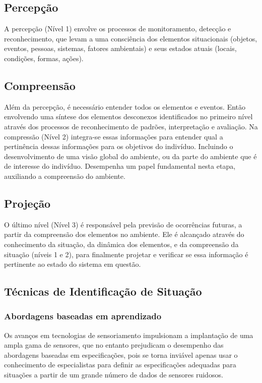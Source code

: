 \documentclass[12pt,a4paper,compsoc]{IEEEtran}
\begin{document}
\subsection{Percepção}

  A percepção (Nível 1)  envolve os processos de monitoramento, detecção e reconhecimento, que
  levam a uma consciência dos elementos situacionais (objetos, eventos, pessoas, sistemas, fatores
  ambientais) e seus estados atuais (locais, condições, formas, ações).


\subsection{Compreensão}

  Além da percepção, é necessário entender todos os elementos e eventos. Então envolvendo uma 
  síntese dos elementos desconexos identificados no primeiro nível através dos processos de 
  reconhecimento de padrões, interpretação e avaliação. Na compressão (Nível 2) integra-se essas
  informações para entender qual a pertinência dessas informações para os objetivos do indivíduo.
  Incluindo o desenvolvimento de uma visão global do ambiente, ou da parte do ambiente que é de 
  interesse do indivíduo. Desempenha um papel fundamental nesta etapa, auxiliando a compreensão do
  ambiente.


\subsection{Projeção}

  O último nível (Nível 3)  é responsável pela previsão de ocorrências futuras, a partir da 
  compreensão dos elementos no ambiente. Ele é alcançado através do conhecimento da situação, da
  dinâmica dos elementos, e da compreensão da situação (níveis 1 e 2), para finalmente projetar e
  verificar se essa informação é pertinente ao estado do sistema em questão.


\subsection{Técnicas de Identificação de Situação}


\subsubsection{Abordagens baseadas em aprendizado}

  Os avanços em tecnologias de sensoriamento impulsionam a implantação de uma ampla gama de
  sensores, que no entanto prejudicam o desempenho das abordagens baseadas em especificações, pois
  se torna inviável apenas usar o conhecimento de especialistas para definir as especificações
  adequadas para situações a partir de um grande número de dados de sensores ruidosos.
  
\end{document}
